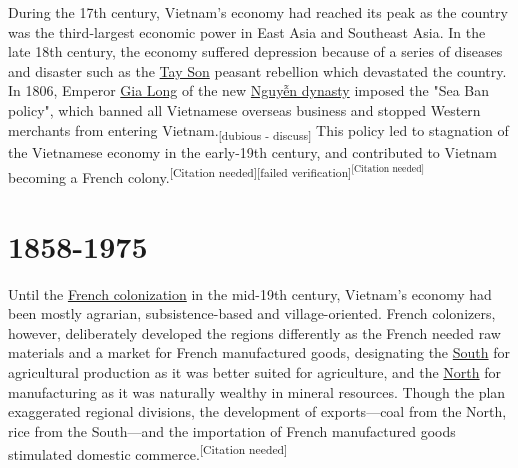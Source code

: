 \documentclass[openany]{book}
\begin{document}
During the 17th century, Vietnam's economy had reached its peak as the country was the third-largest economic power in East Asia and Southeast Asia. In the late 18th century, the economy suffered depression because of a series of diseases and disaster such as the \href{https://en.wikipedia.org/wiki/Tay_Son}{Tay Son} peasant rebellion which devastated the country. In 1806, Emperor \href{https://en.wikipedia.org/wiki/Gia_Long}{Gia Long} of the new \href{https://en.wikipedia.org/wiki/Nguy%E1%BB%85n_dynasty}{Nguyễn dynasty} imposed the "Sea Ban policy", which banned all Vietnamese overseas business and stopped Western merchants from entering Vietnam.\textsubscript{[dubious - discuss]} This policy led to stagnation of the Vietnamese economy in the early-19th century, and contributed to Vietnam becoming a French colony.\textsuperscript{[Citation needed][failed verification]\textsuperscript{[Citation needed]}}
\section{1858-1975}

Until the \href{https://en.wikipedia.org/wiki/French_Indochina}{French colonization} in the mid-19th century, Vietnam's economy had been mostly agrarian, subsistence-based and village-oriented. French colonizers, however, deliberately developed the regions differently as the French needed raw materials and a market for French manufactured goods, designating the \href{https://en.wikipedia.org/wiki/Cochinchina}{South} for agricultural production as it was better suited for agriculture, and the \href{https://en.wikipedia.org/wiki/Tonkin}{North} for manufacturing as it was naturally wealthy in mineral resources. Though the plan exaggerated regional divisions, the development of exports—coal from the North, rice from the South—and the importation of French manufactured goods stimulated domestic commerce.\textsuperscript{[Citation needed]}
\end{document}
